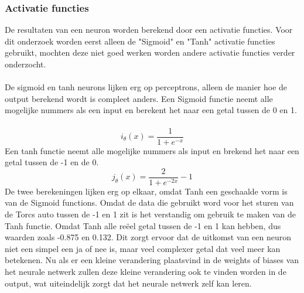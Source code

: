 \subsubsection{Activatie functies}
De resultaten van een neuron worden berekend door een activatie functies. Voor dit onderzoek worden eerst alleen de "Sigmoid" en "Tanh" activatie functies gebruikt, mochten deze niet goed werken worden andere activatie functies verder onderzocht\cite{learning}. \\\\
De sigmoid en tanh neurons lijken erg op perceptrons, alleen de manier hoe de output berekend wordt is compleet anders. Een Sigmoid functie neemt alle mogelijke nummers als een input en berekent het naar een getal tussen de 0 en 1.\\\\
\begin{equation}
    i_ \theta (x) =  \frac{\mathrm{1} }{\mathrm{1} + e^{-x} }  \label{sigmoid}
  \end{equation}
Een tanh functie neemt alle mogelijke nummers als input en brekend het naar een getal tussen de -1 en de 0.\\
\begin{equation}
    j_ \theta (x) =  \frac{\mathrm{2} }{\mathrm{1} + e^{-2x} } -1 \label{tanh}
  \end{equation}
  \linebreak
  \noindent De twee berekeningen lijken erg op elkaar, omdat Tanh een geschaalde vorm is van de Sigmoid functions.
Omdat de data die gebruikt word voor het sturen van de Torcs auto tussen de -1 en 1 zit is het verstandig om gebruik te maken van de Tanh functie. Omdat Tanh alle reëel getal tussen de -1 en 1 kan hebben, dus waarden zoals -0.875 en 0.132. Dit zorgt ervoor dat de uitkomst van een neuron niet een simpel een ja of nee is, maar veel complexer getal dat veel meer kan betekenen. Nu als er een kleine verandering plaatsvind in de weights of biases van het neurale netwerk zullen deze kleine verandering ook te vinden worden in de output, wat uiteindelijk zorgt dat het neurale netwerk zelf kan leren.\\\\

